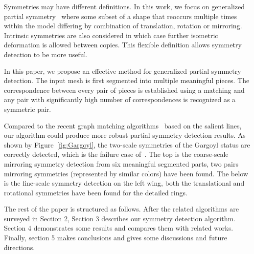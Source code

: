 Symmetries may have different definitions. In this work, we focus on generalized partial symmetry~\cite{mitra2006,berner2011} where some subset of a shape that reoccurs multiple times within the model differing by combination of translation, rotation or mirroring. Intrinsic symmetries are also considered in which case further isometric deformation is allowed between copies. This flexible definition allows symmetry detection to be more useful.

In this paper, we propose an effective method for generalized partial symmetry detection.
The input mesh is first segmented into multiple meaningful pieces. The correspondence between every pair of pieces
is established using a matching and any pair with significantly high number of correspondences is recognized as a symmetric pair.

Compared to the recent graph matching algorithms~\cite{bokeloh2009,berner2011} based on the salient lines, our algorithm could produce more robust partial symmetry detection results.
As shown by Figure~\ref{fig:Gargoyl}, the two-scale symmetries of the Gargoyl status are correctly detected, which is the failure case of~\cite{berner2011}.
The top is the coarse-scale mirroring symmetry detection from six meaningful segmented parts, two pairs mirroring symmetries (represented by similar colors) have been found.
The below is the fine-scale symmetry detection on the left wing, both the translational and rotational symmetries have been found for the detailed rings.    

The rest of the paper is structured as follows. After the related algorithms are surveyed in Section 2, Section 3 describes our symmetry detection algorithm. 
Section 4 demonstrates some results and compares them with related works. Finally, section 5 makes conclusions and gives some discussions and future directions. 